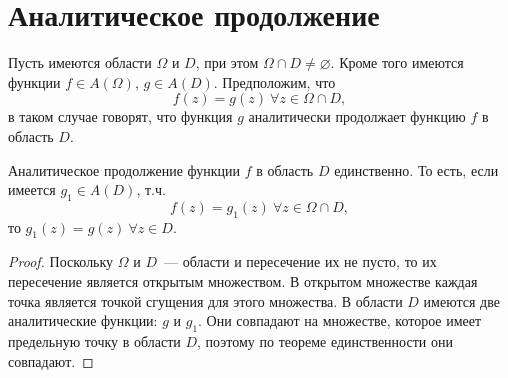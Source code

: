 \documentclass[main]{subfiles}
\begin{document}
\section{Аналитическое продолжение} 
\begin{definition}
    Пусть имеются области $\Omega$ и $D$, при этом $\Omega \cap D \neq \varnothing$.
    Кроме того имеются функции $f \in A(\Omega)$, $g \in A(D)$.
    Предположим, что
    \[f(z) = g(z)\ \forall z \in \Omega \cap D, \]
    в таком случае говорят, что функция $g$ аналитически продолжает функцию $f$ в область $D$.
\end{definition}
\begin{theorem}
    Аналитическое продолжение функции $f$ в область $D$ единственно.
    То есть, если имеется $g_1 \in A(D)$, т.ч.
    \[f(z) = g_1(z)\ \forall z \in \Omega \cap D, \]
    то $g_1(z) = g(z)\ \forall z \in D$.
\end{theorem}
\begin{proof}
    Поскольку $\Omega$ и $D$~--- области и пересечение их не пусто, то их пересечение является открытым множеством.
    В открытом множестве каждая точка является точкой сгущения для этого множества.
    В области $D$ имеются две аналитические функции: $g$ и $g_1$.
    Они совпадают на множестве, которое имеет предельную точку в области $D$, поэтому по теореме единственности они совпадают.
\end{proof}
\end{document}
